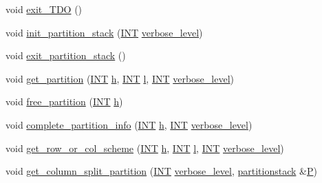 \begin{DoxyCompactItemize}
\item 
void \mbox{\hyperlink{classtdo__scheme_a9ba9a565269fef79130f7b546660ebad}{exit\+\_\+\+T\+DO}} ()
\item 
void \mbox{\hyperlink{classtdo__scheme_a88ee0be1cbf7309f0c5cfe96216c4b56}{init\+\_\+partition\+\_\+stack}} (\mbox{\hyperlink{galois_8h_a09fddde158a3a20bd2dcadb609de11dc}{I\+NT}} \mbox{\hyperlink{simeon_8_c_a818073fbcc2f439e7c56952f67386122}{verbose\+\_\+level}})
\item 
void \mbox{\hyperlink{classtdo__scheme_a74620eccf6df140397430fc5487de0cd}{exit\+\_\+partition\+\_\+stack}} ()
\item 
void \mbox{\hyperlink{classtdo__scheme_af6f141b86e464a6be4238b84b05a59c4}{get\+\_\+partition}} (\mbox{\hyperlink{galois_8h_a09fddde158a3a20bd2dcadb609de11dc}{I\+NT}} \mbox{\hyperlink{alphabet2_8_c_a16611451551e3d15916bae723c3f59f7}{h}}, \mbox{\hyperlink{galois_8h_a09fddde158a3a20bd2dcadb609de11dc}{I\+NT}} \mbox{\hyperlink{alphabet2_8_c_a89606eca6b563ec68d2da2e84657736f}{l}}, \mbox{\hyperlink{galois_8h_a09fddde158a3a20bd2dcadb609de11dc}{I\+NT}} \mbox{\hyperlink{simeon_8_c_a818073fbcc2f439e7c56952f67386122}{verbose\+\_\+level}})
\item 
void \mbox{\hyperlink{classtdo__scheme_aea7a33fd0b9b11013f772f578f21c3fb}{free\+\_\+partition}} (\mbox{\hyperlink{galois_8h_a09fddde158a3a20bd2dcadb609de11dc}{I\+NT}} \mbox{\hyperlink{alphabet2_8_c_a16611451551e3d15916bae723c3f59f7}{h}})
\item 
void \mbox{\hyperlink{classtdo__scheme_a2474c22639d8963a90448ab2686ac449}{complete\+\_\+partition\+\_\+info}} (\mbox{\hyperlink{galois_8h_a09fddde158a3a20bd2dcadb609de11dc}{I\+NT}} \mbox{\hyperlink{alphabet2_8_c_a16611451551e3d15916bae723c3f59f7}{h}}, \mbox{\hyperlink{galois_8h_a09fddde158a3a20bd2dcadb609de11dc}{I\+NT}} \mbox{\hyperlink{simeon_8_c_a818073fbcc2f439e7c56952f67386122}{verbose\+\_\+level}})
\item 
void \mbox{\hyperlink{classtdo__scheme_a8abe612cd722a42da85178d8ff577e54}{get\+\_\+row\+\_\+or\+\_\+col\+\_\+scheme}} (\mbox{\hyperlink{galois_8h_a09fddde158a3a20bd2dcadb609de11dc}{I\+NT}} \mbox{\hyperlink{alphabet2_8_c_a16611451551e3d15916bae723c3f59f7}{h}}, \mbox{\hyperlink{galois_8h_a09fddde158a3a20bd2dcadb609de11dc}{I\+NT}} \mbox{\hyperlink{alphabet2_8_c_a89606eca6b563ec68d2da2e84657736f}{l}}, \mbox{\hyperlink{galois_8h_a09fddde158a3a20bd2dcadb609de11dc}{I\+NT}} \mbox{\hyperlink{simeon_8_c_a818073fbcc2f439e7c56952f67386122}{verbose\+\_\+level}})
\item 
void \mbox{\hyperlink{classtdo__scheme_a5555b89fcee5e51193ccc8e13ac782a5}{get\+\_\+column\+\_\+split\+\_\+partition}} (\mbox{\hyperlink{galois_8h_a09fddde158a3a20bd2dcadb609de11dc}{I\+NT}} \mbox{\hyperlink{simeon_8_c_a818073fbcc2f439e7c56952f67386122}{verbose\+\_\+level}}, \mbox{\hyperlink{classpartitionstack}{partitionstack}} \&\mbox{\hyperlink{classtdo__scheme_ac9beab3ff56b5145a9b141f3b1bf75d0}{P}})

\end{DoxyCompactItemize}
